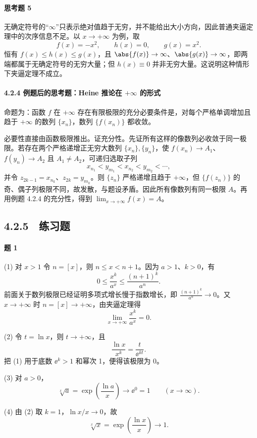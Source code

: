 \paragraph{思考题 5}
\begin{xsolution}
无确定符号的“$\infty$”只表示绝对值趋于无穷，并不能给出大小方向，因此普通夹逼定理中的次序信息不足。以 $x\to+\infty$ 为例，取
\[
  f(x)=-x^2,\qquad h(x)=0,\qquad g(x)=x^2.
\]
恒有 $f(x)\leq h(x)\leq g(x)$，且 $\abs{f(x)}\to\infty$、$\abs{g(x)}\to\infty$，即两端都属于无确定符号的无穷大量；但 $h(x)\equiv0$ 并非无穷大量。这说明这种情形下夹逼定理不成立。
\end{xsolution}

\paragraph{4.2.4 例题后的思考题：Heine 推论在 $+\infty$ 的形式}
\begin{xsolution}
命题为：函数 $f$ 在 $+\infty$ 存在有限极限的充分必要条件是，对每个严格单调增加且趋于 $+\infty$ 的数列 $\{x_n\}$，数列 $\{f(x_n)\}$ 都收敛。

必要性直接由函数极限推出。证充分性。先证所有这样的像数列必收敛于同一极限。若存在两个严格递增正无穷大数列 $\{x_n\},\{y_n\}$，使
$f(x_n)\to A_1$、$f(y_n)\to A_2$ 且 $A_1\ne A_2$，可递归选取子列
\[
  x_{n_1}<y_{m_1}<x_{n_2}<y_{m_2}<\cdots,
\]
并令 $z_{2k-1}=x_{n_k}$、$z_{2k}=y_{m_k}$。则 $\{z_n\}$ 严格递增且趋于 $+\infty$，但 $\{f(z_n)\}$ 的奇、偶子列极限不同，故发散，与题设矛盾。因此所有像数列有同一极限 $A$。再用例题 4.2.4 的充分性，得到 $\lim_{x\to+\infty}f(x)=A$。
\end{xsolution}

\subsection*{4.2.5　练习题}

\paragraph{题 1}
\begin{xsolution}
(1) 对 $x>1$ 令 $n=[x]$，则 $n\leq x<n+1$。因为 $a>1$、$k>0$，有
\[
  0\leq\frac{x^k}{a^x}
  \leq\frac{(n+1)^k}{a^n}.
\]
前面关于数列极限已经证明多项式增长慢于指数增长，即
$\frac{(n+1)^k}{a^n}\to0$。又 $x\to+\infty$ 时 $n=[x]\to+\infty$，由夹逼定理得
\[
  \lim_{x\to+\infty}\frac{x^k}{a^x}=0.
\]

(2) 令 $t=\ln x$，则 $t\to+\infty$，且
\[
  \frac{\ln x}{x^k}=\frac{t}{\ee^{kt}}.
\]
把 (1) 用于底数 $\ee^k>1$ 和幂次 1，便得该极限为 0。

(3) 对 $a>0$，
\[
  \sqrt[x]a=\exp\left(\frac{\ln a}{x}\right)\to\ee^0=1
  \qquad(x\to\infty).
\]

(4) 由 (2) 取 $k=1$，$\ln x/x\to0$，故
\[
  \sqrt[x]x=\exp\left(\frac{\ln x}{x}\right)\to1.
\]
\end{xsolution}

